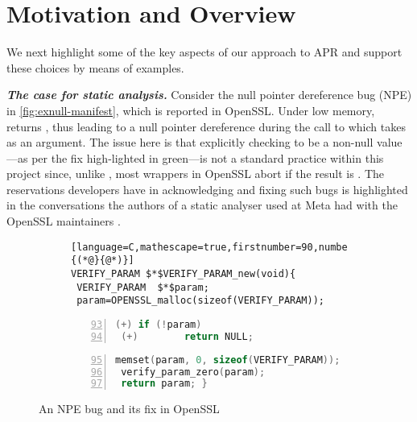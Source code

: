 \section{Motivation and Overview}
We next highlight some of the key aspects of our approach to APR and support these choices by means of examples. 

\noindent \emph{\bf The case for static analysis.}
Consider the null pointer dereference bug (NPE) in \autoref{fig:exnull-manifest}, which is reported in OpenSSL.
Under low memory,  returns , thus leading to a null pointer dereference during the call to  which takes  as an argument. The issue here is that explicitly checking  to be a non-null value---as per the fix high-lighted in green---is not a standard practice  within this project since,
  unlike  , most  wrappers in OpenSSL abort if the result is . The reservations developers have in acknowledging and fixing such bugs is highlighted in the conversations the authors of a static analyser used at Meta had with the OpenSSL maintainers \cite{Le2022}. 


\begin{figure}[t]\hspace{1.4em}
{\footnotesize
\begin{subfigure}{0.41\textwidth}
\begin{lstlisting}[language=C,mathescape=true,firstnumber=90,numbers=left,escapeinside={(*@}{@*)}]
VERIFY_PARAM $*$VERIFY_PARAM_new(void){
 VERIFY_PARAM  $*$param; 
 param=OPENSSL_malloc(sizeof(VERIFY_PARAM));
\end{lstlisting}
\vspace{-\baselineskip}
\begin{lstlisting}[language=C,mathescape=true,firstnumber=93,numbers=left,backgroundcolor=\color{green!20}] 
 (+) if (!param)
 (+)        return NULL;
\end{lstlisting}  
\vspace{-\baselineskip}
\begin{lstlisting}[language=C,mathescape=true,firstnumber=95,numbers=left] 
 memset(param, 0, sizeof(VERIFY_PARAM));
 verify_param_zero(param);
 return param; }
  \end{lstlisting}
  \end{subfigure}
  \vspace{-0.5em}
\caption{An NPE bug
  \vspace{-1.5em}
 and its fix in OpenSSL}
\label{fig:exnull-manifest}
}
\end{figure}

